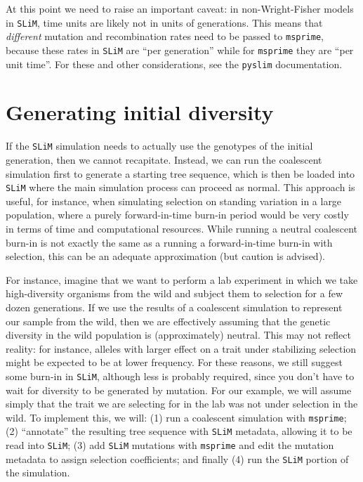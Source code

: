 \documentclass[12pt]{article}
\newcommand{\msprime}[0]{\texttt{msprime}\xspace}
\newcommand{\slim}[0]{\texttt{SLiM}\xspace}
\newcommand{\pyslim}[0]{\texttt{pyslim}\xspace}
\begin{document}
At this point we need to raise an important caveat:
in non-Wright-Fisher models in \slim,
time units are likely not in units of generations.
This means that \emph{different} mutation and recombination rates need to be passed to \msprime,
because these rates in \slim are ``per generation'' while for \msprime they are ``per unit time''.
For these and other considerations, see the \pyslim documentation.

\section{Generating initial diversity} %

If the \slim simulation needs to actually use the genotypes of the initial generation,
then we cannot recapitate.
Instead, we can run the coalescent simulation first to generate a starting tree sequence,
which is then be loaded into \slim where the main simulation process can proceed as normal.
This approach is useful, for instance, when simulating selection on standing variation in a large population,
where a purely forward-in-time burn-in period would be very costly in terms of time and computational resources.
While running a neutral coalescent burn-in is not exactly the same as a running a forward-in-time burn-in with selection,
this can be an adequate approximation (but caution is advised).

For instance,
imagine that we want to perform a lab experiment in which we take high-diversity
organisms from the wild and subject them to selection for a few dozen generations.
If we use the results of a coalescent simulation to represent our sample from the wild,
then we are effectively assuming that the genetic diversity in the wild population is (approximately) neutral.
This may not reflect reality: for instance,
alleles with larger effect on a trait under stabilizing selection might be expected to be at lower frequency.
For these reasons, we still suggest some burn-in in \slim,
although less is probably required, since you don't have to wait for diversity to be generated by mutation.
For our example, we will assume simply that the trait we are selecting for in the lab was
not under selection in the wild. To implement this, we will:
(1) run a coalescent simulation with \msprime;
(2) ``annotate'' the resulting tree sequence with \slim metadata, allowing it to be read into \slim;
(3) add \slim mutations with \msprime
        and edit the mutation metadata to assign selection coefficients; and finally
(4) run the \slim portion of the simulation.
\end{document}
